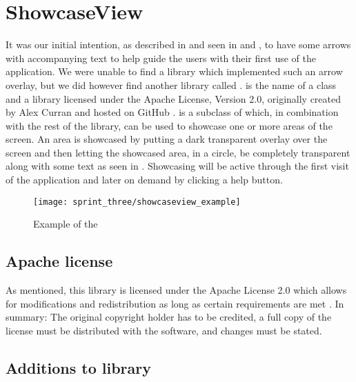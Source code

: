 
\section{ShowcaseView}
\label{sec:showcaseview}

It was our initial intention, as described in  and seen in  and , to have some arrows with accompanying text to help guide the users with their first use of the application. We were unable to find a library which implemented such an arrow overlay, but we did however find another library called .  is the name of a class and a library licensed under the Apache License, Version 2.0, originally created by Alex Curran and hosted on GitHub \parencite{showcaseview_by_alex_curran}.  is a subclass of  which, in combination with the rest of the library, can be used to showcase one or more areas of the screen. An area is showcased by putting a dark transparent overlay over the screen and then letting the showcased area, in a circle, be completely transparent along with some text as seen in . Showcasing will be active through the first visit of the application and later on demand by clicking a help button. \\

\begin{figure}[!htbp]
    \centering
    \texttt{[image: sprint\_three/showcaseview\_example]}
    \caption{Example of the }
    \label{fig:showcaseview_example}
\end{figure}

\subsection{Apache license}
As mentioned, this library is licensed under the Apache License 2.0 which allows for modifications and redistribution as long as certain requirements are met \parencite{apache2license}. In summary: The original copyright holder has to be credited, a full copy of the license must be distributed with the software, and changes must be stated.

\subsection{Additions to library}

